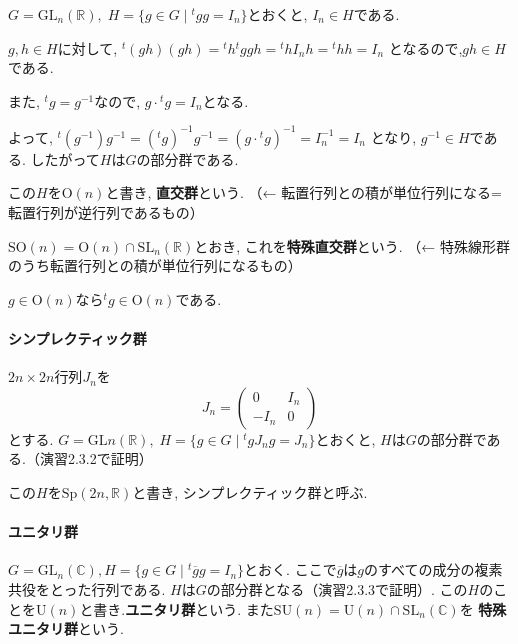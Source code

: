 $G=\mathrm{GL}_n(\mathbb{R}),\; H=\{g \in G \mid {}^t gg=I_n\}$とおくと,
$I_n \in H$である.

$ g,h \in H $に対して,
$ {}^t (gh)(gh) = {}^t h {}^t g gh = {}^t h I_n h = {}^t h h= I_n $
となるので,$ gh \in H $である.

また, ${}^t g =g^{-1}$なので, $g\cdot {}^t g=I_n$となる.

よって,
$ {}^t(g^{-1})g^{-1} = ({}^t g)^{-1}g^{-1}=(g \cdot {}^t g)^{-1} = I_n^{-1} = I_n $
となり, $g^{-1} \in H $である. したがって$H$は$G$の部分群である.

この$H$を$\mathrm{O}(n)$と書き, \textbf{直交群}という.
（← 転置行列との積が単位行列になる=転置行列が逆行列であるもの）

$ \mathrm{SO}(n) = \mathrm{O}(n) \cap \mathrm{SL}_n(\mathbb{R})$とおき,
これを\textbf{特殊直交群}という.
（← 特殊線形群のうち転置行列との積が単位行列になるもの）

$ g \in \mathrm{O}(n)$なら$ {}^t g \in \mathrm{O}(n)$である.\\

\paragraph*{シンプレクティック群}
$2n\times 2n$行列$J_n$を
\[ J_n = \begin{pmatrix} 0 & I_n \\	-I_n & 0 \end{pmatrix}  \]
とする.
$ G=\mathrm{GL}n(\mathbb{R}),\; H=\{g \in G \mid {}^t g J_n g=J_n\} $とおくと,
$H$は$G$の部分群である.（演習2.3.2で証明）

この$H$を$\mathrm{Sp}(2n,\mathbb{R})$と書き, シンプレクティック群と呼ぶ.\\

\paragraph*{ユニタリ群}
$G=\mathrm{GL}_n(\mathbb{C}), H=\{g \in G \mid {}^t\overline{g} g = I_n \} $とおく.
ここで$ \overline{g} $は$g$のすべての成分の複素共役をとった行列である.
$H$は$G$の部分群となる（演習2.3.3で証明）. 
この$H$のことを$ \mathrm{U}(n)$と書き.\textbf{ユニタリ群}という.
また$\mathrm{SU}(n)=\mathrm{U}(n)\cap \mathrm{SL}_n(\mathbb{C})$を
\textbf{特殊ユニタリ群}という.\\

